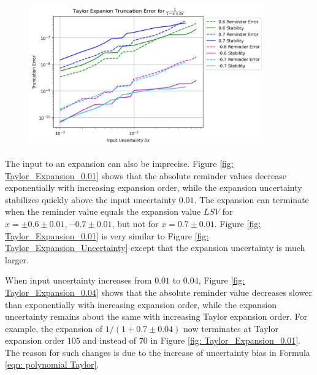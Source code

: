 \documentclass[twoside]{article}
\numberwithin{equation}{section}
\begin{document}
\begin{figure}[p]
\centering
\includegraphics[height=2.4in]{Taylor_Expansion_Error.pdf} 
\label{fig: Taylor_Expansion_Error}
\end{figure}


The input to an expansion can also be imprecise.
Figure \ref{fig: Taylor_Expansion_0.01} shows that the absolute reminder values decrease exponentially with increasing expansion order, while the expansion uncertainty stabilizes quickly above the input uncertainty $0.01$.  
The expansion can terminate when the reminder value equals the expansion value $LSV$ for $x=\pm 0.6 \pm 0.01, -0.7 \pm 0.01$, but not for $x=0.7 \pm 0.01$.
Figure \ref{fig: Taylor_Expansion_0.01} is very similar to Figure \ref{fig: Taylor_Expansion_Uncertainty} except that the expansion uncertainty is much larger.

When input uncertainty increases from $0.01$ to $0.04$, Figure \ref{fig: Taylor_Expansion_0.04} shows that the absolute reminder value decreases slower than exponentially with increasing expansion order, while the expansion uncertainty remains about the same with increasing Taylor expansion order.
For example, the expansion of $1/(1 + 0.7 \pm 0.04)$ now terminates at Taylor expansion order $105$ and instead of $70$ in Figure \ref{fig: Taylor_Expansion_0.01}.
The reason for such changes is due to the increase of uncertainty bias in Formula \eqref{eqn: polynomial Taylor}.
\end{document}
